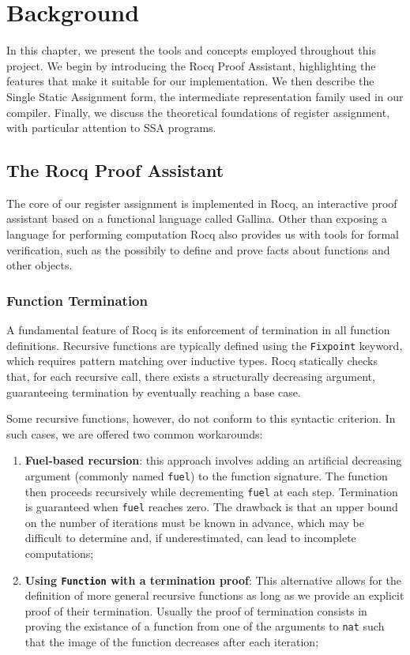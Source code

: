 
\chapter{Background}
\label{cha:background}

In this chapter, we present the tools and concepts employed throughout this project. We begin by introducing the Rocq Proof Assistant, highlighting the features that make it suitable for our implementation. We then describe the Single Static Assignment form, the intermediate representation family used in our compiler. Finally, we discuss the theoretical foundations of register assignment, with particular attention to SSA programs.

\section{The Rocq Proof Assistant}

The core of our register assignment is implemented in Rocq, an interactive proof assistant based on a functional language called Gallina. Other than exposing a language for performing computation Rocq also provides us with tools for formal verification, such as the possibily to define and prove facts about functions and other objects.

\subsection{Function Termination}
\label{subsec:funterm}

A fundamental feature of Rocq is its enforcement of termination in all function definitions. Recursive functions are typically defined using the \texttt{Fixpoint} keyword, which requires pattern matching over inductive types. Rocq statically checks that, for each recursive call, there exists a structurally decreasing argument, guaranteeing termination by eventually reaching a base case.

Some recursive functions, however, do not conform to this syntactic criterion. In such cases, we are offered two common workarounds:

\begin{enumerate}
    \item \textbf{Fuel-based recursion}: this approach involves adding an artificial decreasing argument (commonly named \texttt{fuel}) to the function signature. The function then proceeds recursively while decrementing \texttt{fuel} at each step. Termination is guaranteed when \texttt{fuel} reaches zero. The drawback is that an upper bound on the number of iterations must be known in advance, which may be difficult to determine and, if underestimated, can lead to incomplete computations;
    \item \textbf{Using \texttt{Function} with a termination proof}: This alternative allows for the definition of more general recursive functions as long as we provide an explicit proof of their termination. Usually the proof of termination consists in proving the existance of a function from one of the arguments to \texttt{nat} such that the image of the function decreases after each iteration;
\end{enumerate}

